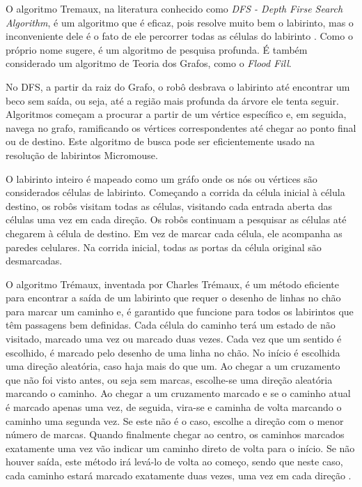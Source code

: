 O algoritmo Tremaux, na literatura conhecido como \emph{DFS - Depth Firse Search Algorithm}, é um algoritmo que é eficaz, pois resolve muito bem o labirinto, mas o inconveniente dele é o fato de ele percorrer todas as células do labirinto \cite{yadav:2012}. Como o próprio nome sugere, é um algoritmo de pesquisa profunda. É também considerado um algoritmo de Teoria dos Grafos, como o \emph{Flood Fill}. 

No DFS, a partir da raiz do Grafo, o robô desbrava o labirinto até encontrar um beco sem saída, ou seja, até a região mais profunda da árvore ele tenta seguir. Algoritmos começam a procurar a partir de um vértice específico e, em seguida, navega no grafo, ramificando os vértices correspondentes até chegar ao ponto final ou de destino. Este algoritmo de busca pode ser eficientemente usado na resolução de labirintos Micromouse. 

O labirinto inteiro é mapeado como um gráfo onde os nós ou vértices são considerados células de labirinto. Começando a corrida da célula inicial à célula destino, os robôs visitam todas as células, visitando cada entrada aberta das células uma vez em cada direção. Os robôs continuam a pesquisar as células até chegarem à célula de destino. Em vez de marcar cada célula, ele acompanha as paredes celulares. Na corrida inicial, todas as portas da célula original são desmarcadas. 

\begin{citacao}
O algoritmo Trémaux, inventada por Charles Trémaux, é um método eficiente para encontrar a saída de um labirinto que requer o desenho de linhas no chão para marcar um caminho e, é garantido que funcione para todos os labirintos que têm passagens bem definidas. Cada célula do caminho terá um estado de não visitado, marcado uma vez ou marcado duas vezes. Cada vez que um sentido é escolhido, é marcado pelo desenho de uma linha no chão. No início é escolhida uma direção aleatória, caso haja mais do que um. Ao chegar a um cruzamento que não foi visto antes, ou seja sem marcas, escolhe-se uma direção aleatória marcando o caminho. Ao chegar a um cruzamento marcado e se o caminho atual é marcado apenas uma vez, de seguida, vira-se e caminha de volta marcando o caminho uma segunda vez. Se este não é o caso, escolhe a direção com o menor número de marcas. Quando finalmente chegar ao centro, os caminhos marcados exatamente uma vez vão indicar um caminho direto de volta para o início. Se não houver saída, este método irá levá-lo de volta ao começo, sendo que neste caso, cada caminho estará marcado exatamente duas vezes, uma vez em cada direção .

\end{citacao}

